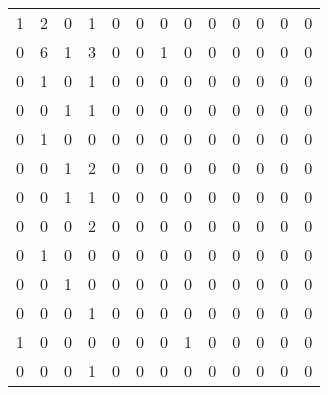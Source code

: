 \begin{tabular}{rrrrrrrrrrrrr}
       1 &       2 &          0 &               1 &                0 &       0 &          0 &          0 &         0 &         0 &      0 &             0 &         0 \\
       0 &       6 &          1 &               3 &                0 &       0 &          1 &          0 &         0 &         0 &      0 &             0 &         0 \\
       0 &       1 &          0 &               1 &                0 &       0 &          0 &          0 &         0 &         0 &      0 &             0 &         0 \\
       0 &       0 &          1 &               1 &                0 &       0 &          0 &          0 &         0 &         0 &      0 &             0 &         0 \\
       0 &       1 &          0 &               0 &                0 &       0 &          0 &          0 &         0 &         0 &      0 &             0 &         0 \\
       0 &       0 &          1 &               2 &                0 &       0 &          0 &          0 &         0 &         0 &      0 &             0 &         0 \\
       0 &       0 &          1 &               1 &                0 &       0 &          0 &          0 &         0 &         0 &      0 &             0 &         0 \\
       0 &       0 &          0 &               2 &                0 &       0 &          0 &          0 &         0 &         0 &      0 &             0 &         0 \\
       0 &       1 &          0 &               0 &                0 &       0 &          0 &          0 &         0 &         0 &      0 &             0 &         0 \\
       0 &       0 &          1 &               0 &                0 &       0 &          0 &          0 &         0 &         0 &      0 &             0 &         0 \\
       0 &       0 &          0 &               1 &                0 &       0 &          0 &          0 &         0 &         0 &      0 &             0 &         0 \\
       1 &       0 &          0 &               0 &                0 &       0 &          0 &          1 &         0 &         0 &      0 &             0 &         0 \\
       0 &       0 &          0 &               1 &                0 &       0 &          0 &          0 &         0 &         0 &      0 &             0 &         0 \\

\end{tabular}
